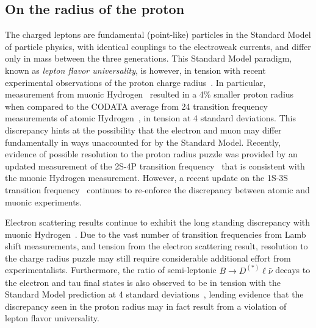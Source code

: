 \documentclass[prd,aps,twocolumn,superscriptaddress,tightenlines,nofootinbib,floatfix,preprintnumbers,10pt]{revtex4-1}
\begin{document}
\subsection{On the radius of the proton}
The charged leptons are fundamental (point-like) particles in the
Standard Model of particle physics, with identical couplings 
to the electroweak currents, and differ only in mass between the three
generations. This Standard Model paradigm, known as \textit{lepton flavor universality}, 
is however, in tension with recent experimental observations of the proton 
charge radius~\cite{Carlson:2015jba}. In particular, measurement from muonic 
Hydrogen~\cite{nature09250} resulted in a 4\% smaller proton radius when 
compared to the CODATA average from 24 transition frequency measurements 
of atomic Hydrogen~\cite{RevModPhys.80.633}, in tension at 4 standard
deviations. This discrepancy hints at the possibility that the
electron and muon may differ fundamentally in ways unaccounted for by
the Standard Model. Recently, evidence of possible resolution to the
proton radius puzzle was provided by an updated measurement of the
2S-4P transition frequency~\cite{Beyer79} that is consistent with the
muonic Hydrogen measurement. However, a recent update on the 1S-3S
transition frequency~\cite{fleurbaey:tel-01633631} continues to
re-enforce the discrepancy between atomic and muonic
experiments.

Electron scattering results continue to exhibit the long standing
discrepancy with muonic Hydrogen~\cite{Sick:2018fzn}. Due to the vast
number of transition frequencies from Lamb shift measurements, and
tension from the electron scattering result, resolution to the charge
radius puzzle may still require considerable additional effort from
experimentalists. Furthermore, the ratio of semi-leptonic
$B\rightarrow D^{(*)}\ell\bar{\nu}$ decays to the electron and tau
final states is also observed to be in tension with the Standard Model
prediction at 4 standard deviations~\cite{Ciezarek:2017yzh}, lending
evidence that the discrepancy seen in the proton radius may in fact result 
from a violation of lepton flavor universality.
\end{document}
